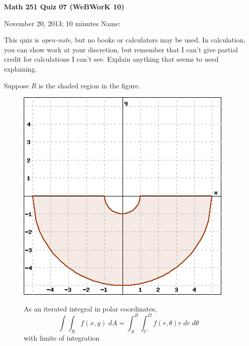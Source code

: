 \documentclass[12pt]{exam}
\begin{document}
\noindent
\textbf{{\large Math 251 \hfill Quiz 07 (WeBWorK 10)}}

\noindent
November 20, 2013; 10 minutes \hfill Name: \underline{\hspace{3in}} 

\noindent

\noindent
This quiz is \emph{open-note}, but no books or calculators may be used.
In calculation, you can show work at your discretion, but remember that
I can't give partial credit for calculations I can't see. Explain
anything that seems to need explaining.

\begin{questions} 

\question[8] Suppose $R$ is the shaded region in the figure. 

\begin{figure}[!h]
    \begin{minipage}[t]{0.3\textwidth}
        \vspace{0pt}
        \includegraphics[width=\linewidth]{images/region.png}
    \end{minipage} \hfill
    \begin{minipage}[t]{0.6\textwidth}
        \vspace{0pt}
        As an iterated integral in polar coordinates,
        \begin{equation*}
            \int \!\!\!\!\!\! \int_R f(x,y)\; dA = \int_A^B \int_C^D f(r,\theta) r \; dr \; d\theta
        \end{equation*}
        with limits of integration
        \begin{parts}

\end{parts}
\end{minipage}
\end{figure}
\end{questions}
\end{document}
